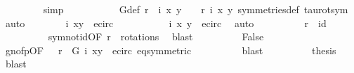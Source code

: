 \begin{isabellebody}
\ \ \ \ \ \ \ \ \isamarkupfalse%
{\isacharparenleft}simp{\isacharparenright}\ \isanewline
\ \ \ \ \ \ \ \ \isamarkupfalse%
\ G{\isacharunderscore}def\ {\isacartoucheopen}{\isacharparenleft}r{\isacharprime}\ {\isasymcirc}\ i{\isacharparenright}\ {\isacharparenleft}x{\isacharcomma}\ y{\isacharparenright}\ {\isacharequal}\ {\isacharparenleft}{\isasymtau}\ {\isasymcirc}\ r{\isacharparenright}\ {\isacharparenleft}i\ {\isacharparenleft}x{\isacharcomma}\ y{\isacharparenright}{\isacharparenright}{\isacartoucheclose}\ symmetries{\isacharunderscore}def\ tau{\isacharunderscore}rot{\isacharunderscore}sym\ \isamarkupfalse%
\ auto\isanewline
\ \ \ \ \ \ \isamarkupfalse%
\ {\isachardoublequoteopen}i\ {\isacharparenleft}x{\isacharcomma}y{\isacharparenright}\ {\isasymin}\ e{\isacharunderscore}circ{\isachardoublequoteclose}\ \isanewline
\ \ \ \ \ \ \ \ \isamarkupfalse%
\ {\isacartoucheopen}i\ {\isacharparenleft}x{\isacharcomma}\ y{\isacharparenright}\ {\isasymin}\ e{\isacharunderscore}circ{\isacartoucheclose}\ \isamarkupfalse%
\ auto\isanewline
\ \ \ \ \ \ \isamarkupfalse%
\ {\isachardoublequoteopen}{\isasymtau}\ {\isasymcirc}\ r{\isacharprime}{\isacharprime}\ {\isasymnoteq}\ id{\isachardoublequoteclose}\isanewline
\ \ \ \ \ \ \ \ \isamarkupfalse%
\ sym{\isacharunderscore}not{\isacharunderscore}id{\isacharbrackleft}OF\ {\isacartoucheopen}r{\isacharprime}{\isacharprime}\ {\isasymin}\ rotations{\isacartoucheclose}{\isacharbrackright}\ \isamarkupfalse%
\ blast\isanewline
\ \ \ \ \ \ \isamarkupfalse%
\ \isamarkupfalse%
\ {\isachardoublequoteopen}False{\isachardoublequoteclose}\isanewline
\ \ \ \ \ \ \ \ \isamarkupfalse%
\ g{\isacharunderscore}no{\isacharunderscore}fp{\isacharbrackleft}OF\ {\isacartoucheopen}{\isasymtau}\ {\isasymcirc}\ r{\isacharprime}{\isacharprime}\ {\isasymin}\ G{\isacartoucheclose}\ {\isacartoucheopen}i\ {\isacharparenleft}x{\isacharcomma}y{\isacharparenright}\ {\isasymin}\ e{\isacharunderscore}circ{\isacartoucheclose}\ eq{}{\isacharparenleft}{}{\isacharparenright}{\isacharbrackleft}symmetric{\isacharbrackright}{\isacharbrackright}\isanewline
\ \ \ \ \ \ \ \ \isamarkupfalse%
\ blast\isanewline
\ \ \ \ \ \ \isamarkupfalse%
\ \isamarkupfalse%
\ {\isacharquery}thesis\ \isamarkupfalse%
\ blast\isanewline
\ \ \ \ \isamarkupfalse%
\isanewline
\ \ \ \ \ \ \isamarkupfalse%

\end{isabellebody}
